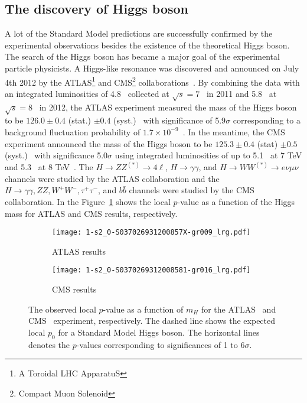 \subsection{The discovery of Higgs boson}
A lot of the Standard Model predictions are successfully confirmed by the experimental observations besides the existence of the theoretical Higgs boson. 
The search of the Higgs boson has became a major goal of the experimental particle physicists.
A Higgs-like resonance was discovered and announced on July 4th 2012 by the ATLAS\footnote{A Toroidal LHC ApparatuS} and CMS\footnote{Compact Muon Solenoid} collaborations~\cite{Aad:2012tfa,Chatrchyan:2012xdj}.
By combining the data with an integrated luminosities of 4.8~{\ifb} collected at $\sqrt{s} = 7$~{\TeV} in 2011 and 5.8~{\ifb} at $\sqrt{s}=8$~{\TeV} in 2012, the ATLAS experiment measured the mass of the Higgs boson to be $126.0 \pm 0.4$ (stat.) $\pm 0.4$ (syst.)~{\GeV} with significance of 5.9$\sigma$ corresponding to a background fluctuation probability of $1.7 \times 10^{-9}$~\cite{Aad:2012tfa}.
In the meantime, the CMS experiment announced the mass of the Higgs boson to be $125.3 \pm 0.4$ (stat) $\pm 0.5$ (syst.)~{\GeV} with significance 5.0$\sigma$ using integrated luminosities of up to 5.1~{\ifb} at 7 TeV and 5.3~{\ifb} at 8 TeV~\cite{Chatrchyan:2012xdj}. 
The $H \rightarrow ZZ^{(*)} \rightarrow 4\ell$, $H \rightarrow \gamma \gamma$, and $H \rightarrow WW^{(*)} \rightarrow e\nu\mu\nu$ channels were studied by the ATLAS collaboration and the $H \rightarrow \gamma \gamma, ZZ, W^{+}W^{-}, \tau^{+}\tau^{-}$, and $b\bar{b}$ channels were studied by the CMS collaboration.
In the Figure~\ref{fig:sm_discovery_of_Higgs} shows the local $p$-value as a function of the Higgs mass for ATLAS and CMS results, respectively.

\begin{figure}[htbp]
\begin{center}
\begin{subfigure}[b]{0.48\textwidth}
\begin{center}
\texttt{[image: 1-s2\_0-S037026931200857X-gr009\_lrg.pdf]}
\caption{ATLAS results}
\end{center}
\end{subfigure}%
\begin{subfigure}[b]{0.48\textwidth}
\begin{center}
\texttt{[image: 1-s2\_0-S0370269312008581-gr016\_lrg.pdf]}
\caption{CMS results}
\end{center}
\end{subfigure}
\end{center}
\caption{The observed local $p$-value as a function of $m_{H}$ for the ATLAS~\cite{Aad:2012tfa} and CMS~\cite{Chatrchyan:2012xdj} experiment, respectively.
The dashed line shows the expected local $p_{0}$ for a Standard Model Higgs boson.
The horizontal lines denotes the $p$-values corresponding to significances of 1 to 6$\sigma$.
}
\label{fig:sm_discovery_of_Higgs}
\end{figure}

